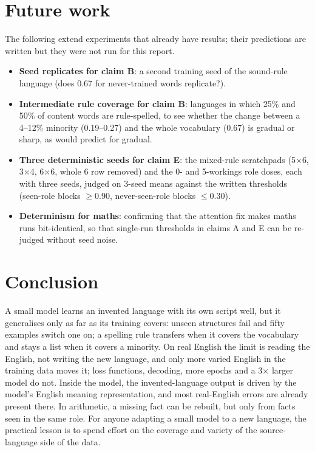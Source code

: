 \documentclass{article} %
\begin{document}
\section{Future work}\label{sec:future}

The following extend experiments that already have results; their predictions are written but they were not run
for this report.
\begin{itemize}
\item \textbf{Seed replicates for claim B}: a second training seed of the sound-rule language (does 0.67 for
never-trained words replicate?).
\item \textbf{Intermediate rule coverage for claim B}: languages in which 25\% and 50\% of content words are
rule-spelled, to see whether the change between a 4--12\% minority (0.19--0.27) and the whole vocabulary (0.67) is
gradual or sharp, as \citet{friedman2026tolerance} would predict for gradual.
\item \textbf{Three deterministic seeds for claim E}: the mixed-rule scratchpads (5$\times$6, 3$\times$4,
6$\times$6, whole 6 row removed) and the 0- and 5-workings role doses, each with three seeds, judged on 3-seed means
against the written thresholds (seen-role blocks $\ge$0.90, never-seen-role blocks $\le$0.30).
\item \textbf{Determinism for maths}: confirming that the attention fix makes maths runs bit-identical, so that
single-run thresholds in claims A and E can be re-judged without seed noise.
\end{itemize}

\section{Conclusion}

A small model learns an invented language with its own script well, but it generalises only as far as its training
covers: unseen structures fail and fifty examples switch one on; a spelling rule transfers when it covers the
vocabulary and stays a list when it covers a minority. On real English the limit is reading the English, not
writing the new language, and only more varied English in the training data moves it; loss functions, decoding,
more epochs and a 3$\times$ larger model do not. Inside the model, the invented-language output is driven by the
model's English meaning representation, and most real-English errors are already present there. In arithmetic, a
missing fact can be rebuilt, but only from facts seen in the same role. For anyone adapting a small model to a new language, the practical lesson is to spend effort on
the coverage and variety of the source-language side of the data.
\end{document}
